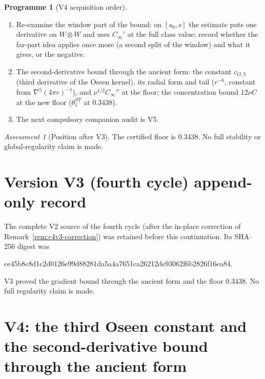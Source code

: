 \documentclass[11pt]{article}
\theoremstyle{plain}
\theoremstyle{definition}
\newtheorem{programme}[theorem]{Programme}
\theoremstyle{remark}
\newtheorem{assessment}[theorem]{Assessment}
\begin{document}
\begin{programme}[V4 acquisition order]
\label{prog:c4v4}
\begin{enumerate}[label=\textup{(AC\arabic*)},leftmargin=4.8em]
\item Re-examine the window part of the bound: on \([s_0,s]\) the
      estimate puts one derivative on \(W\otimes W\) and uses \(C_\infty'\) at the
      full class value; record whether the far-part idea applies
      once more (a second split of the window) and what it gives,
      or the negative.
\item The second-derivative bound through the ancient form: the
      constant \(c_{O,3}\) (third derivative of the Oseen kernel), its radial
      form and tail (\(r^{-6}\), constant from \(\nabla^5(4\pi r)^{-1}\)), and
      \(\nu^{1/2}C_\infty''\) at the floor; the concentration bound \(12\nu C\) at the
      new floor (\(\theta_1^{ST}\) at \(0.3438\)).
\item The next compulsory companion audit is V5.
\end{enumerate}
\end{programme}

\begin{assessment}[Position after V3]
\label{ass:c4v3-position}
The certified floor is \(0.3438\).  No full stability or
global-regularity claim is made.
\end{assessment}

\section*{Version V3 (fourth cycle) append-only record}

The complete V2 source of the fourth cycle (after the in-place
correction of Remark~\ref{rem:c4v3-correction}) was retained before
this continuation.  Its SHA--256 digest was
\begin{center}\scriptsize\ttfamily
ce45b8c8d1c2d0126e99d88281da5a4a7651ca26212de93062f6b2826f16ea84.
\end{center}
V3 proved the gradient bound through the ancient form and the floor
\(0.3438\).  No full regularity claim is made.

\section{V4: the third Oseen constant and the second-derivative bound through the ancient form}
\label{sec:c4v4-entry}
\end{document}
